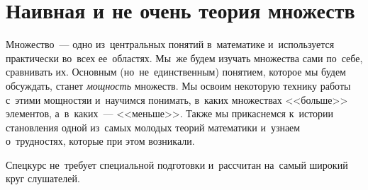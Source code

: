 
\section*{Наивная и не очень теория множеств}



Множество~--- одно из~центральных понятий в~математике и~используется
практически во~всех ее~областях.
Мы~же будем изучать множества сами по~себе, сравнивать их.
Основным (но~не~единственным) понятием, которое мы будем обсуждать, станет
\emph{мощность} множеств.
Мы освоим некоторую технику работы с~этими мощностяи и~научимся понимать,
в~каких множествах <<больше>> элементов, а~в~каких~--- <<меньше>>.
Также мы прикаснемся к~истории становления одной из~самых молодых теорий
математики и~узнаем о~трудностях, которые при этом возникали.

Спецкурс не~требует специальной подготовки и~рассчитан на~самый широкий круг
слушателей.

